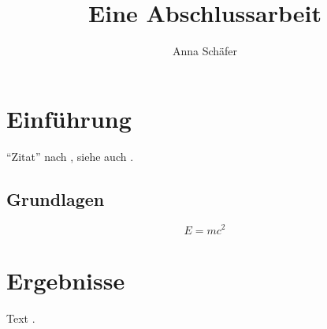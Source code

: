 \documentclass[a4paper,12pt]{scrreprt}
\begin{document}
\title{Eine Abschlussarbeit}\author{Anna Schäfer}\maketitle
\tableofcontents
\chapter{Einführung}
\enquote{Zitat} nach \cite{knuth84}, siehe auch \textcite{lamport86}.
\section{Grundlagen}
\[ E = mc^2 \]
\chapter{Ergebnisse}
Text \autocite{mueller20}.
\printbibliography
\end{document}
